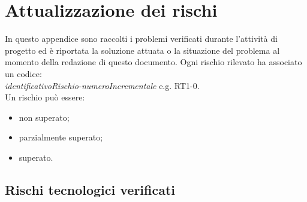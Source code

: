 \section{Attualizzazione dei rischi}
\label{section:rischi_rilevati}
In questo appendice sono raccolti i problemi verificati durante l'attività di progetto ed è riportata la soluzione attuata o la situazione del problema al momento della redazione di questo documento.
Ogni rischio rilevato ha associato un codice: \\
\textit{identificativoRischio-numeroIncrementale} e.g. RT1-0. \\
\noindent Un rischio può essere:
\begin{itemize}
    \item non superato;
    \item parzialmente superato;
    \item superato.
\end{itemize}
\subsection{Rischi tecnologici verificati}
\def\problems{
    {   
        RT1-0,
        \noexpand\textbf{Fase rilevazione:} progettazione architetturale \noexpand\newline
        Alcuni membri del gruppo non conoscono o non sono pratici dello strumento Github.,
        Tali membri hanno dedicato allo strumento un breve periodo di autoformazione prima d'iniziare l'esperienza sul campo. I membri più esperti del team sono stati e resteranno sempre disponibili per chiarimenti.,
        \noexpand\textbf{Ultimo aggiornamento:} 2021-04-03 \noexpand\newline
        Il rischio risulta superato.
    },
    {
        RT1-1,
        \noexpand\textbf{Fase rilevazione:} analisi \noexpand\newline
        L'esperienza con LaTeX da parte del team (nella sua interezza) è poca o nulla.,
        La redazione dei documenti si è inizialmente rivelato un processo lento e frustrante{,} tuttavia è stato considerato un male necessario. Ancora adesso si riscontrano difficoltà rispetto alla creazione di tabelle e posizionamento di immagini.,
        \noexpand\textbf{Ultimo aggiornamento:} 2021-04-03 \noexpand\newline
        Il rischio risulta superato.
    },
    {   
        RT1-2,
        \noexpand\textbf{Fase rilevazione:} progettazione architetturale \noexpand\newline
        Nessun membro del gruppo è pratico o ha conoscenze approfondite delle tecnologie coinvolte per la realizzazione del POC.,
        È stato dedicato un periodo di 2 settimane all'autoapprendimento delle tecnologie coinvolte{,} in particolare è stato deciso che ogni membro del gruppo deve avere per ognuna una conoscenza almeno superficiale.,
        \noexpand\textbf{Ultimo aggiornamento:} 2021-04-03 \noexpand\newline
        Ogni membro del gruppo è specializzato in una particolare tecnologia{,} tuttavia queste non sono ancora completamente padroneggiate. Sebbene contenuto il rischio risulta parzialmente superato.
    },
}

